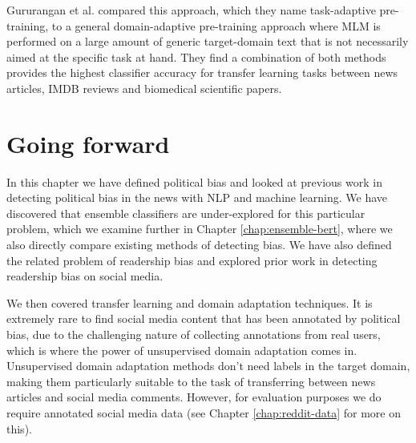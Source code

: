 Gururangan et al. \cite{dont-stop-pretraining} compared this approach, which they name task-adaptive pre-training, to a general domain-adaptive pre-training approach where MLM is performed on a large amount of generic target-domain text that is not necessarily aimed at the specific task at hand. They find a combination of both methods provides the highest classifier accuracy for transfer learning tasks between news articles, IMDB reviews and biomedical scientific papers.

\section{Going forward}

In this chapter we have defined political bias and looked at previous work in detecting political bias in the news with NLP and machine learning. We have discovered that ensemble classifiers are under-explored for this particular problem, which we examine further in Chapter \ref{chap:ensemble-bert}, where we also directly compare existing methods of detecting bias. We have also defined the related problem of readership bias and explored prior work in detecting readership bias on social media.

We then covered transfer learning and domain adaptation techniques. It is extremely rare to find social media content that has been annotated by political bias, due to the challenging nature of collecting annotations from real users, which is where the power of unsupervised domain adaptation comes in. Unsupervised domain adaptation methods don't need labels in the target domain, making them particularly suitable to the task of transferring between news articles and social media comments. However, for evaluation purposes we do require annotated social media data (see Chapter \ref{chap:reddit-data} for more on this).